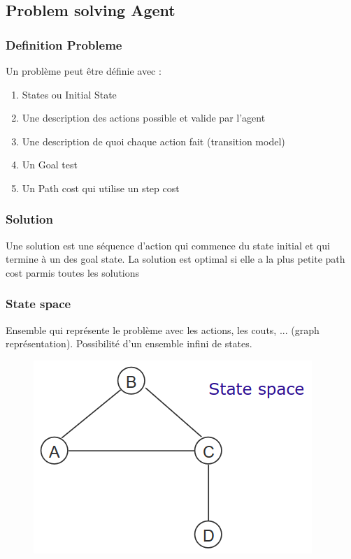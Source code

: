 	\subsection{Problem solving Agent}
		\subsubsection{Definition Probleme}
			Un problème peut être définie avec :
			\begin{enumerate}
				\item States ou Initial State
				\item Une description des actions possible et valide par l'agent
				\item Une description de quoi chaque action fait (transition model)
				\item Un Goal test
				\item Un Path cost qui utilise un step cost
			\end{enumerate}
		\subsubsection{Solution}
			Une solution est une séquence d'action qui commence du state initial et qui termine à un des goal state. La solution est optimal si elle a la plus petite path cost parmis toutes les solutions
		\subsubsection{State space}
			Ensemble qui représente le problème avec les actions, les couts, ... (graph représentation). Possibilité d'un ensemble infini de states.
			\begin{figure}[htp]
				\centering
				\includegraphics[width=.5\textwidth]{img/StateSpace.png}
			\end{figure}
